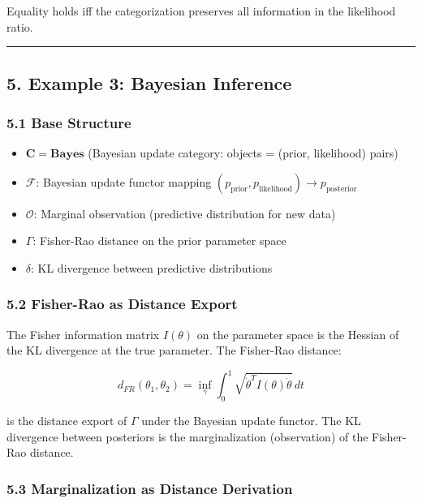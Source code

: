 \documentclass[
]{article}
\providecommand{\tightlist}{%
  \setlength{\itemsep}{0pt}\setlength{\parskip}{0pt}}
\begin{document}
Equality holds iff the categorization preserves all information in the
likelihood ratio.

\begin{center}\rule{0.5\linewidth}{0.5pt}\end{center}

\subsection{5. Example 3: Bayesian
Inference}\label{example-3-bayesian-inference}

\subsubsection{5.1 Base Structure}\label{base-structure-2}

\begin{itemize}
\tightlist
\item
  \(\mathbf{C} = \mathbf{Bayes}\) (Bayesian update category: objects =
  (prior, likelihood) pairs)
\item
  \(\mathcal{F}\): Bayesian update functor mapping
  \((p_{\text{prior}}, p_{\text{likelihood}}) \to p_{\text{posterior}}\)
\item
  \(\mathcal{O}\): Marginal observation (predictive distribution for new
  data)
\item
  \(\Gamma\): Fisher-Rao distance on the prior parameter space
\item
  \(\delta\): KL divergence between predictive distributions
\end{itemize}

\subsubsection{5.2 Fisher-Rao as Distance
Export}\label{fisher-rao-as-distance-export}

The Fisher information matrix \(I(\theta)\) on the parameter space is
the Hessian of the KL divergence at the true parameter. The Fisher-Rao
distance:

\[d_{FR}(\theta_1, \theta_2) = \inf_{\gamma} \int_0^1 \sqrt{\dot{\theta}^T I(\theta) \dot{\theta}} \, dt\]

is the distance export of \(\Gamma\) under the Bayesian update functor.
The KL divergence between posteriors is the marginalization
(observation) of the Fisher-Rao distance.

\subsubsection{5.3 Marginalization as Distance
Derivation}\label{marginalization-as-distance-derivation}
\end{document}
